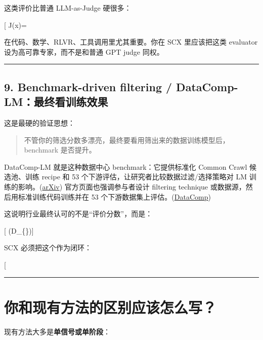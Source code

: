 \documentclass[
  12pt,
]{ctexart}
\begin{document}
这类评价比普通 LLM-as-Judge 硬很多：

{[} J(x)=\mathbf 1{[}\text{test passed}{]}{]}

在代码、数学、RLVR、工具调用里尤其重要。你在 SCX 里应该把这类 evaluator
设为高可靠专家，而不是和普通 GPT judge 同权。

\begin{center}\rule{0.5\linewidth}{0.5pt}\end{center}

\subsection{9. Benchmark-driven filtering /
DataComp-LM：最终看训练效果}\label{benchmark-driven-filtering-datacomp-lmux6700ux7ec8ux770bux8badux7ec3ux6548ux679c}

这是最硬的验证思想：

\begin{quote}
不管你的筛选分数多漂亮，最终要看用筛出来的数据训练模型后，benchmark
是否提升。
\end{quote}

DataComp-LM 就是这种数据中心 benchmark：它提供标准化 Common Crawl
候选池、训练 recipe 和 53 个下游评估，让研究者比较数据过滤/选择策略对 LM
训练的影响。(\href{https://arxiv.org/abs/2406.11794?utm_source=chatgpt.com}{arXiv})
官方页面也强调参与者设计 filtering technique
或数据源，然后用标准训练代码训练并在 53
个下游数据集上评估。(\href{https://www.datacomp.ai/dclm/?utm_source=chatgpt.com}{DataComp})

这说明行业最终认可的不是``评价分数''，而是：

{[} (\mathcal D\_\{\}){]}

SCX 必须把这个作为闭环：

{[}  \rightarrow {} \rightarrow {}
\rightarrow {} \rightarrow \text{校准评价器}{]}

\begin{center}\rule{0.5\linewidth}{0.5pt}\end{center}

\section{你和现有方法的区别应该怎么写？}\label{ux4f60ux548cux73b0ux6709ux65b9ux6cd5ux7684ux533aux522bux5e94ux8be5ux600eux4e48ux5199}

现有方法大多是\textbf{单信号或单阶段}：
\end{document}
